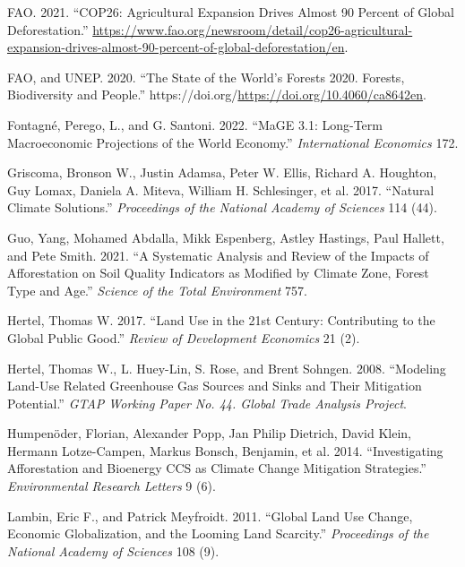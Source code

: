 \documentclass[
]{article}
\newlength{\cslhangindent}
\newlength{\cslentryspacingunit} %
\newenvironment{CSLReferences}[2] %
 {%
  \setlength{\parindent}{0pt}
  \ifodd #1
  \let\oldpar\par
  \def\par{\hangindent=\cslhangindent\oldpar}
  \fi
  \setlength{\parskip}{#2\cslentryspacingunit}
 }%
 {}
\begin{document}
\begin{CSLReferences}{1}{0}
\leavevmode{}%
FAO. 2021. {``COP26: Agricultural Expansion Drives Almost 90 Percent of Global Deforestation.''} \url{https://www.fao.org/newsroom/detail/cop26-agricultural-expansion-drives-almost-90-percent-of-global-deforestation/en}.

\leavevmode{}%
FAO, and UNEP. 2020. {``The State of the World's Forests 2020. Forests, Biodiversity and People.''} https://doi.org/\url{https://doi.org/10.4060/ca8642en}.

\leavevmode{}%
Fontagné, Perego, L., and G. Santoni. 2022. {``MaGE 3.1: Long-Term Macroeconomic Projections of the World Economy.''} \emph{International Economics} 172.

\leavevmode{}%
Griscoma, Bronson W., Justin Adamsa, Peter W. Ellis, Richard A. Houghton, Guy Lomax, Daniela A. Miteva, William H. Schlesinger, et al. 2017. {``Natural Climate Solutions.''} \emph{Proceedings of the National Academy of Sciences} 114 (44).

\leavevmode{}%
Guo, Yang, Mohamed Abdalla, Mikk Espenberg, Astley Hastings, Paul Hallett, and Pete Smith. 2021. {``A Systematic Analysis and Review of the Impacts of Afforestation on Soil Quality Indicators as Modified by Climate Zone, Forest Type and Age.''} \emph{Science of the Total Environment} 757.

\leavevmode{}%
Hertel, Thomas W. 2017. {``Land Use in the 21st Century: Contributing to the Global Public Good.''} \emph{Review of Development Economics} 21 (2).

\leavevmode{}%
Hertel, Thomas W., L. Huey-Lin, S. Rose, and Brent Sohngen. 2008. {``Modeling Land-Use Related Greenhouse Gas Sources and Sinks and Their Mitigation Potential.''} \emph{GTAP Working Paper No. 44. Global Trade Analysis Project}.

\leavevmode{}%
Humpenöder, Florian, Alexander Popp, Jan Philip Dietrich, David Klein, Hermann Lotze-Campen, Markus Bonsch, Benjamin, et al. 2014. {``Investigating Afforestation and Bioenergy CCS as Climate Change Mitigation Strategies.''} \emph{Environmental Research Letters} 9 (6).

\leavevmode{}%
Lambin, Eric F., and Patrick Meyfroidt. 2011. {``Global Land Use Change, Economic Globalization, and the Looming Land Scarcity.''} \emph{Proceedings of the National Academy of Sciences} 108 (9).


\end{CSLReferences}
\end{document}
